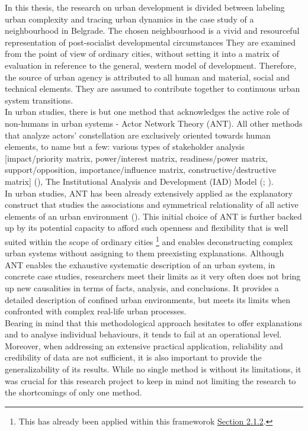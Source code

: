 \documentclass[11pt]{report}
\begin{document}
{{{{In this thesis, the research on urban development is divided between labeling urban complexity and tracing urban dynamics in the case study of a neighbourhood in Belgrade.
The chosen neighbourhood is a vivid and resourceful representation of post-socialist developmental circumstances
They are examined from the point of view of ordinary cities, without setting it into a matrix of evaluation in reference to the general, western model of development.
Therefore, the source of urban agency is attributed to 
all human and material, social and technical elements. They are assumed to contribute together to continuous urban system transitions.
\\

In urban studies, there is but one method that acknowledges the active role of non-humans in urban systems - Actor Network Theory (ANT).
All other methods that analyze actors' constellation are exclusively oriented towards human elements, to name but a few: various types of stakeholder analysis [impact/priority matrix, power/interest matrix, readiness/power matrix, support/opposition, importance/influence matrix,
constructive/destructive matrix] (\href{Mathur}{\citealt{mathur_defining_2007}}), The Institutional Analysis and Development (IAD) Model (\href{Ostrom}{\citealt{ostrom_governing_1995}}; \href{Ostrom}{\citealt{ostrom_upravljanje_2006}}).
\\

In urban studies, ANT has been already extensively applied as the explanatory construct that studies the associations and symmetrical relationality of all active elements of an urban environment (\href{Farias}{\citealt{farias_introduction:_2011}}).
This initial choice of ANT is further backed up by its
potential capacity to afford such openness and flexibility that is well suited within the scope of ordinary cities
\footnote{This has already been applied within this frameworok \href{Section 2.1.2}{Section 2.1.2}.} 
and enables deconstructing complex urban systems without assigning to them preexisting explanations.
Although ANT enables the exhaustive systematic description of an urban system, in concrete case studies, researchers meet their limits as it very often does not bring up new causalities in terms of facts, analysis, and conclusions. It provides a detailed description of confined urban environments, but meets its limits when confronted with complex real-life urban processes.
\\

Bearing in mind that this methodological approach hesitates to offer explanations and to analyse individual behaviours, it tends to fail at an operational level.
Moreover, when addressing an extensive practical application, reliability and credibility of data are not sufficient, it is also important to provide the generalizability of its results.
While no single method is without its limitations, it was crucial for this research project to keep in mind not limiting the research to the shortcomings of only one method.
\\

}}}}
\end{document}
